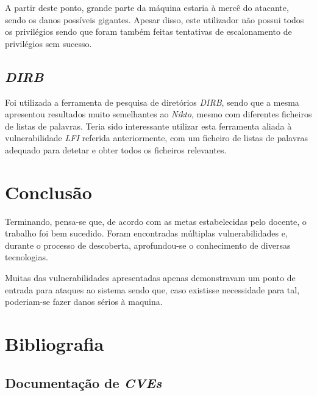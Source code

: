 \documentclass[10pt,english]{article}
\begin{document}
\par A partir deste ponto, grande parte da máquina estaria à mercê do atacante, sendo os danos possíveis gigantes. Apesar disso, este utilizador não possui todos os privilégios sendo que foram também feitas tentativas de escalonamento de privilégios sem sucesso.

\subsection{\textit{DIRB}}

\par Foi utilizada a ferramenta de pesquisa de diretórios \textit{DIRB}, sendo que a mesma apresentou resultados muito semelhantes ao \textit{Nikto}, mesmo com diferentes ficheiros de listas de palavras. Teria sido interessante utilizar esta ferramenta aliada à vulnerabilidade \textit{LFI} referida anteriormente, com um ficheiro de listas de palavras adequado para detetar e obter todos os ficheiros relevantes.










\clearpage

\section{Conclusão}
\par Terminando, pensa-se que, de acordo com as metas estabelecidas pelo docente, o trabalho foi bem sucedido. Foram encontradas múltiplas vulnerabilidades e, durante o processo de descoberta, aprofundou-se o conhecimento de diversas tecnologias.

\par Muitas das vulnerabilidades apresentadas apenas demonstravam um ponto de entrada para ataques ao sistema sendo que, caso existisse necessidade para tal, poderiam-se fazer danos sérios à maquina.

\clearpage

\section{Bibliografia}





\vspace{5mm} %

\subsection{Documentação de \textit{CVEs}}
\label{sec:Bibliografia}
\end{document}
